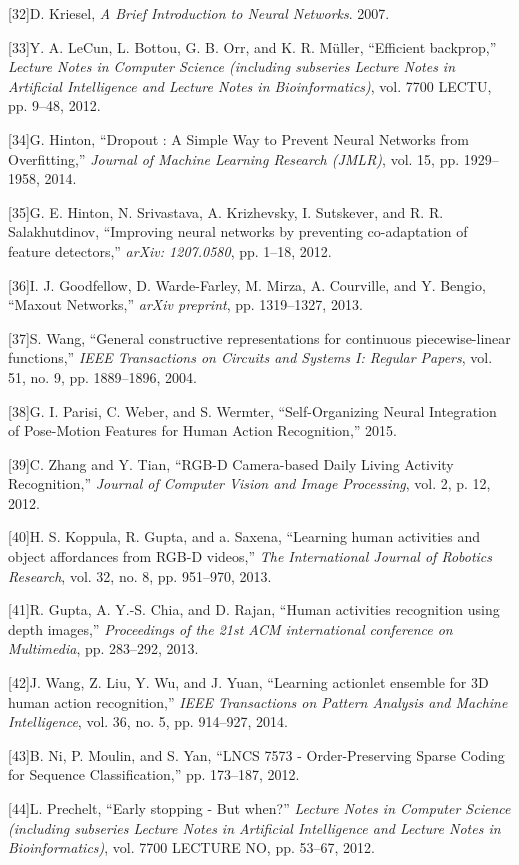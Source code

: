 {[}32{]}D. Kriesel, \emph{A Brief Introduction to Neural Networks}.
2007.

{[}33{]}Y. A. LeCun, L. Bottou, G. B. Orr, and K. R. Müller, ``Efficient
backprop,'' \emph{Lecture Notes in Computer Science (including subseries
Lecture Notes in Artificial Intelligence and Lecture Notes in
Bioinformatics)}, vol. 7700 LECTU, pp. 9--48, 2012.

{[}34{]}G. Hinton, ``Dropout : A Simple Way to Prevent Neural Networks
from Overfitting,'' \emph{Journal of Machine Learning Research (JMLR)},
vol. 15, pp. 1929--1958, 2014.

{[}35{]}G. E. Hinton, N. Srivastava, A. Krizhevsky, I. Sutskever, and R.
R. Salakhutdinov, ``Improving neural networks by preventing
co-adaptation of feature detectors,'' \emph{arXiv: 1207.0580}, pp.
1--18, 2012.

{[}36{]}I. J. Goodfellow, D. Warde-Farley, M. Mirza, A. Courville, and
Y. Bengio, ``Maxout Networks,'' \emph{arXiv preprint}, pp. 1319--1327,
2013.

{[}37{]}S. Wang, ``General constructive representations for continuous
piecewise-linear functions,'' \emph{IEEE Transactions on Circuits and
Systems I: Regular Papers}, vol. 51, no. 9, pp. 1889--1896, 2004.

{[}38{]}G. I. Parisi, C. Weber, and S. Wermter, ``Self-Organizing Neural
Integration of Pose-Motion Features for Human Action Recognition,''
2015.

{[}39{]}C. Zhang and Y. Tian, ``RGB-D Camera-based Daily Living Activity
Recognition,'' \emph{Journal of Computer Vision and Image Processing},
vol. 2, p. 12, 2012.

{[}40{]}H. S. Koppula, R. Gupta, and a. Saxena, ``Learning human
activities and object affordances from RGB-D videos,'' \emph{The
International Journal of Robotics Research}, vol. 32, no. 8, pp.
951--970, 2013.

{[}41{]}R. Gupta, A. Y.-S. Chia, and D. Rajan, ``Human activities
recognition using depth images,'' \emph{Proceedings of the 21st ACM
international conference on Multimedia}, pp. 283--292, 2013.

{[}42{]}J. Wang, Z. Liu, Y. Wu, and J. Yuan, ``Learning actionlet
ensemble for 3D human action recognition,'' \emph{IEEE Transactions on
Pattern Analysis and Machine Intelligence}, vol. 36, no. 5, pp.
914--927, 2014.

{[}43{]}B. Ni, P. Moulin, and S. Yan, ``LNCS 7573 - Order-Preserving
Sparse Coding for Sequence Classification,'' pp. 173--187, 2012.

{[}44{]}L. Prechelt, ``Early stopping - But when?'' \emph{Lecture Notes
in Computer Science (including subseries Lecture Notes in Artificial
Intelligence and Lecture Notes in Bioinformatics)}, vol. 7700 LECTURE
NO, pp. 53--67, 2012.
